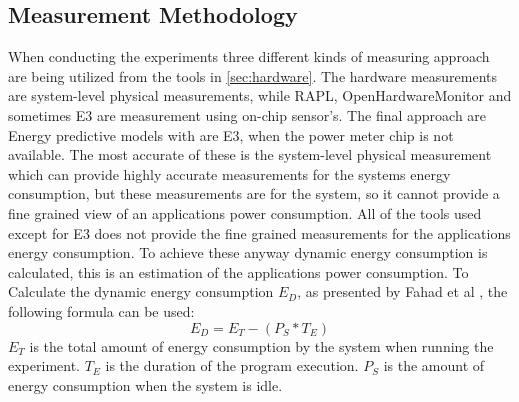 \subsection{Measurement Methodology}
When conducting the experiments three different kinds of measuring approach are being utilized from the tools in \cref{sec:hardware}.
The hardware measurements are system-level physical measurements, while RAPL, OpenHardwareMonitor and sometimes E3 are measurement using on-chip sensor's. The final approach are Energy predictive models with are E3, when the power meter chip is not available. The most accurate of these is the system-level physical measurement which can provide highly accurate measurements for the systems energy consumption, but these measurements are for the system, so it cannot provide a fine grained view of an applications power consumption. All of the tools used except for E3 does not provide the fine grained measurements for the applications energy consumption. To achieve these anyway dynamic energy consumption is calculated, this is an estimation of the applications power consumption. To Calculate the dynamic energy consumption $E_D$, as presented by Fahad et al \cite{fahad2019comparative}, the following formula can be used:
$$E_D = E_T -(P_S * T_E)$$
$E_T$ is the total amount of energy consumption by the system when running the experiment. $T_E$ is the duration of the program execution. $P_S$ is the amount of energy consumption when the system is idle.